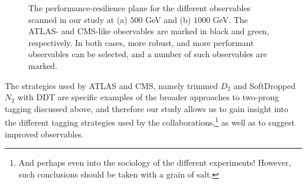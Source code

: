 \documentclass[11pt,letterpaper]{article}
\begin{document}
\begin{figure}
\begin{center}
\qquad
{}
\end{center}
\caption{The performance-resilience plane for the different observables scanned in our study at (a) $500$ GeV and (b) $1000$ GeV. The ATLAS- and CMS-like observables are marked in black and green, respectively. In both cases, more robust, and more performant observables can be selected, and a number of such observables are marked.
}
\label{jetsub_2prong_fig:phasespace}
\end{figure}

The strategies used by ATLAS and CMS, namely trimmed $D_2$ \cite{Larkoski:2015kga,Larkoski:2014gra} and SoftDropped $N_2$ \cite{Moult:2016cvt} with DDT \cite{Dolen:2016kst} are specific examples of the broader approaches to two-prong tagging discussed above, and therefore our study allows us to gain insight into the different tagging strategies used by the collaborations,\footnote{And perhaps even into the sociology of the different experiments! However, such conclusions should be taken with a grain of salt.} as well as to suggest improved observables.
\end{document}
